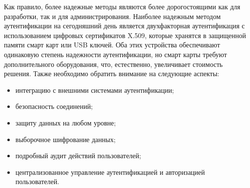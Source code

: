 Как правило, более надежные методы являются более дорогостоящими как для
разработки, так и для администрирования.
 Наиболее надежным методом аутентификации на сегодняшний день является
 двухфакторная аутентификация с использованием цифровых сертификатов X.509,
 которые хранятся в защищенной памяти смарт карт или USB ключей. Оба этих
 устройства обеспечивают одинаковую степень надежности аутентификации, но смарт
 карты требуют дополнительного оборудования, что, естественно, увеличивает
 стоимость решения. Также необходимо обратить внимание на следующие аспекты:
 \begin{itemize}
   \item интеграцию с внешними системами аутентификации;
   \item безопасность соединений;
   \item защиту данных на любом уровне;
   \item выборочное шифрование данных;
   \item подробный аудит
действий пользователей;
   \item централизованное управление аутентификацией и
авторизацией пользователей.
 \end{itemize}

